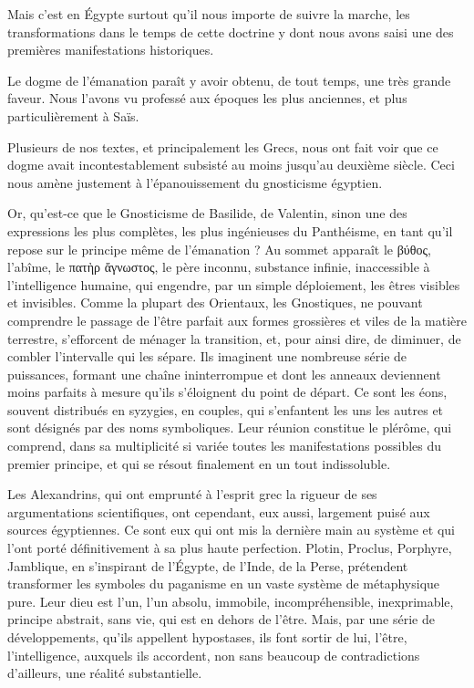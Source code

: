 \documentclass[a4paper, 11pt, oneside]{article}
\begin{document}
Mais c'est en Égypte surtout qu'il nous importe de suivre la marche, les transformations dans le temps de cette doctrine y dont nous avons saisi une des premières manifestations historiques.

Le dogme de l'émanation paraît y avoir obtenu, de tout temps, une très grande faveur. Nous l'avons vu professé aux époques les plus anciennes, et plus particulièrement à Saïs.

Plusieurs de nos textes, et principalement les Grecs, nous ont fait voir que ce dogme avait incontestablement subsisté au moins jusqu'au deuxième siècle. Ceci nous amène justement à l'épanouissement du gnosticisme égyptien.

Or, qu'est-ce que le Gnosticisme de Basilide, de Valentin, sinon une des expressions les plus complètes, les plus ingénieuses du Panthéisme, en tant qu'il repose sur le principe même de l'émanation ? Au sommet apparaît le βύθος, l'abîme, le πατὴρ ἄγνωστος, le père inconnu, substance infinie, inaccessible à l'intelligence humaine, qui engendre, par un simple déploiement, les êtres visibles et invisibles. Comme la plupart des Orientaux, les Gnostiques, ne pouvant comprendre le passage de l'être parfait aux formes grossières et viles de la matière terrestre, s'efforcent de ménager la transition, et, pour ainsi dire, de diminuer, de combler l'intervalle qui les sépare. Ils imaginent une nombreuse série de puissances, formant une chaîne ininterrompue et dont les anneaux deviennent moins parfaits à mesure qu'ils s'éloignent du point de départ. Ce sont les éons, souvent distribués en syzygies, en couples, qui s'enfantent les uns les autres et sont désignés par des noms symboliques. Leur réunion constitue le plérôme, qui comprend, dans sa multiplicité si variée toutes les manifestations possibles du premier principe, et qui se résout finalement en un tout indissoluble.

Les Alexandrins, qui ont emprunté à l'esprit grec la rigueur de ses argumentations scientifiques, ont cependant, eux aussi, largement puisé aux sources égyptiennes. Ce sont eux qui ont mis la dernière main au système et qui l'ont porté définitivement à sa plus haute perfection. Plotin, Proclus, Porphyre, Jamblique, en s'inspirant de l'Égypte, de l'Inde, de la Perse, prétendent transformer les symboles du paganisme en un vaste système de métaphysique pure. Leur dieu est l'un, l'un absolu, immobile, incompréhensible, inexprimable, principe abstrait, sans vie, qui est en dehors de l'être. Mais, par une série de développements, qu'ils appellent hypostases, ils font sortir de lui, l'être, l'intelligence, auxquels ils accordent, non sans beaucoup de contradictions d'ailleurs, une réalité substantielle.
\end{document}
